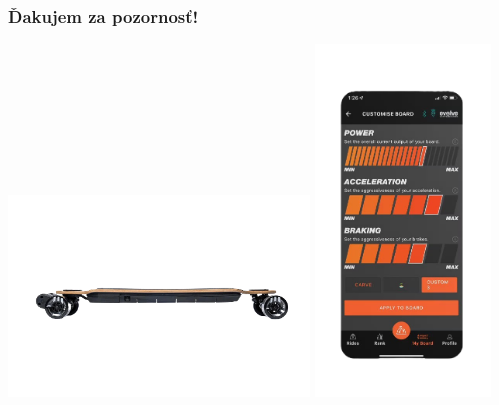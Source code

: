   
  
  \begin{frame}
    \frametitle{Ďakujem za pozornosť!}
    \centering
    \includegraphics[width=0.6\textwidth]{figures/brand-reviews/evolve-longboard.png}
    \includegraphics[width=0.35\textwidth]{figures/brand-reviews/evolve-app.png}
  \end{frame}
  
  \appendix{}
  
  
